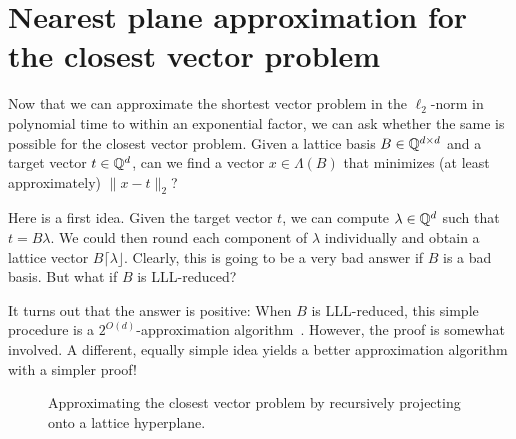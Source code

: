 \section{Nearest plane approximation for the closest vector problem}
\label{sec:nearest-plane-approximation}

Now that we can approximate the shortest vector problem in the $\ell_2$-norm
in polynomial time to within an exponential factor,
we can ask whether the same is possible for the closest vector problem.
Given a lattice basis $B \in \mathbb{Q}^{d \times d}$ and a target vector $t \in \mathbb{Q}^d$,
can we find a vector $x \in \Lambda(B)$ that minimizes (at least approximately) $\|x-t\|_2$?

Here is a first idea.
Given the target vector $t$, we can compute $\lambda \in \mathbb{Q}^d$
such that $t = B \lambda$.
We could then round each component of $\lambda$ individually
and obtain a lattice vector $B \lceil \lambda \rfloor$.
Clearly, this is going to be a very bad answer if $B$ is a bad basis.
But what if $B$ is LLL-reduced?

It turns out that the answer is positive:
When $B$ is LLL-reduced, this simple procedure is a $2^{O(d)}$-approximation algorithm~\cite{MR856638}.
However, the proof is somewhat involved.
A different, equally simple idea yields a better approximation algorithm with a simpler proof!

\begin{figure}
\begin{center}
\end{center}
  \caption{Approximating the closest vector problem by recursively projecting onto a lattice hyperplane.}
  \label{fig:nearest-plane-approximation}
\end{figure}

